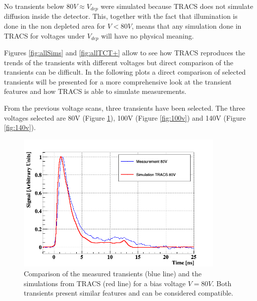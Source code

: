 No transients below $80V \approx V_{dep}$ were simulated because TRACS does not simulate diffusion inside the detector. This, together with the fact that illumination is done in the non depleted area for $V < 80V$, means that any simulation done in TRACS for voltages under $V_{dep}$ will have no physical meaning.

Figures \ref{fig:allSims} and \ref{fig:allTCT+} allow to see how TRACS reproduces the trends of the transients with different voltages but direct comparison of the transients can be difficult. In the following plots a direct comparison of selected transients will be presented for a more comprehensive look at the transient features and how TRACS is able to simulate measurements.

From the previous voltage scans, three transients have been selected. The three voltages selected are 80V (Figure \ref{fig:80v}), 100V (Figure \ref{fig:100v}) and 140V (Figure \ref{fig:140v}). 

\begin{figure}[H]
	\centering
	\includegraphics[width=0.9\textwidth]{80V.png}
	\caption{Comparison of the measured transients (blue line) and the simulations from TRACS (red line) for a bias voltage $V = 80V$. Both transients present similar features and can be considered compatible.}
	\label{fig:80v} 
\end{figure}


